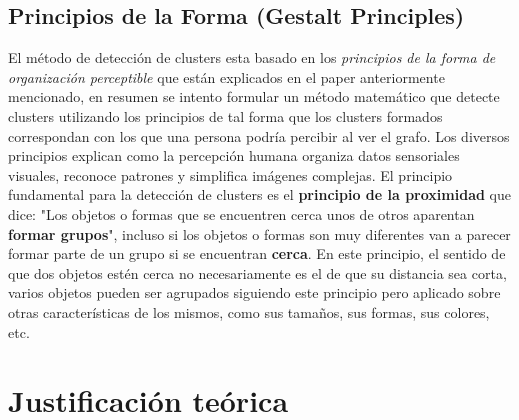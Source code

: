 \documentclass[11pt,a4paper]{article}
\begin{document}
\subsection{Principios de la Forma (Gestalt Principles)}

El método de detección de clusters esta basado en los \textit{principios de la forma de organización perceptible} que están explicados en el paper anteriormente mencionado, en resumen se intento formular un método matemático que detecte clusters utilizando los principios de tal forma que los clusters formados correspondan con los que una persona podría percibir al ver el grafo.
Los diversos principios explican como la percepción humana organiza datos sensoriales visuales, reconoce patrones y simplifica imágenes complejas. El principio fundamental para la detección de clusters es el \textbf{principio de la proximidad} que dice: "Los objetos o formas que se encuentren cerca unos de otros aparentan \textbf{formar grupos}", incluso si los objetos o formas son muy diferentes van a parecer formar parte de un grupo si se encuentran \textbf{cerca}. En este principio, el sentido de que dos objetos estén cerca no necesariamente es el de que su distancia sea corta, varios objetos pueden ser agrupados siguiendo este principio pero aplicado sobre otras características de los mismos, como sus tamaños, sus formas, sus colores, etc.

\section{Justificación teórica}
\end{document}
